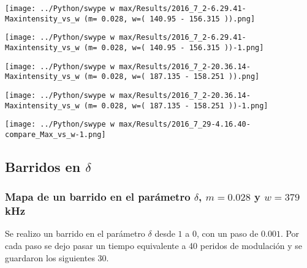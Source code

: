 				\begin{minipage}{0.5\textwidth}
					\centering
					\texttt{[image: ../Python/swype w max/Results/2016\_7\_2-6.29.41-Maxintensity\_vs\_w (m= 0.028, w=( 140.95 - 156.315 )).png]}
				\end{minipage}		
				\begin{minipage}{0.5\textwidth}
					\centering
					\texttt{[image: ../Python/swype w max/Results/2016\_7\_2-6.29.41-Maxintensity\_vs\_w (m= 0.028, w=( 140.95 - 156.315 ))-1.png]}
				\end{minipage}	
				
				\begin{minipage}{0.5\textwidth}
					\centering
					\texttt{[image: ../Python/swype w max/Results/2016\_7\_2-20.36.14-Maxintensity\_vs\_w (m= 0.028, w=( 187.135 - 158.251 )).png]}
				\end{minipage}		
				\begin{minipage}{0.5\textwidth}
					\centering
					\texttt{[image: ../Python/swype w max/Results/2016\_7\_2-20.36.14-Maxintensity\_vs\_w (m= 0.028, w=( 187.135 - 158.251 ))-1.png]}
				\end{minipage}
	
			\begin{center}
				\texttt{[image: ../Python/swype w max/Results/2016\_7\_29-4.16.40-compare\_Max\_vs\_w-1.png]}
			\end{center}
				
				
			
	\subsection{Barridos en $\delta$}
			
		\subsubsection{Mapa de un barrido en el parámetro $\delta$, $m=0.028$ y $w=379$kHz}
		
		Se realizo un barrido en el parámetro $\delta$ desde $1$  a $0$, con un paso de $0.001$.
		Por cada paso se dejo pasar un tiempo equivalente a 40 peridos de modulación y se guardaron los siguientes 30.
		
